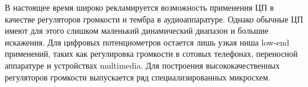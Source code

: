 В настоящее время широко рекламируется возможность применения ЦП в качестве регуляторов громкости и тембра в аудиоаппаратуре. 
Однако обычные ЦП имеют для этого слишком маленький динамический диапазон и большие искажения. 
Для цифровых потенциометров остается лишь узкая ниша low-end применений, таких как регулировка громкости в сотовых телефонах, переносной аппаратуре и устройствах multimedia. 
Для построения высококачественных регуляторов громкости выпускается ряд специализированных микросхем. 

